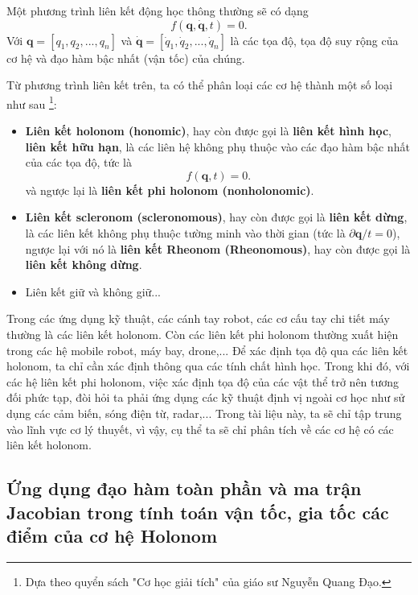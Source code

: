 Một phương trình liên kết động học thông thường sẽ có dạng
\begin{equation}
    f(\mathbf{q}, \mathbf{\dot{q}}, t) = 0.
\end{equation}
Với $\mathbf{q} = [q_1,q_2,...,q_n]$ và $\mathbf{\dot{q}} = [\dot{q}_1,\dot{q}_2,...,\dot{q}_n]$ là các tọa độ, tọa độ suy rộng của cơ hệ và đạo hàm bậc nhất (vận tốc) của chúng.

Từ phương trình liên kết trên, ta có thể phân loại các cơ hệ thành một số loại như sau \footnote{Dựa theo quyển sách "Cơ học giải tích" của giáo sư Nguyễn Quang Đạo.}:
\begin{itemize}
    \item \textbf{Liên kết holonom (honomic)}, hay còn được gọi là \textbf{liên kết hình học}, \textbf{liên kết hữu hạn}, là các liên hệ không phụ thuộc vào các đạo hàm bậc nhất của các tọa độ, tức là
    \begin{equation*}
        f(\mathbf{q}, t) = 0.
    \end{equation*}
    và ngược lại là \textbf{ liên kết phi holonom (nonholonomic)}.
    \item \textbf{Liên kết scleronom (scleronomous)}, hay còn được gọi là \textbf{liên kết dừng}, là các liên kết không phụ thuộc tường minh vào thời gian (tức là $\partial \mathbf{q} / t = 0$), ngược lại với nó là \textbf{liên kết Rheonom (Rheonomous)}, hay còn được gọi là \textbf{liên kết không dừng}.
    \item Liên kết giữ và không giữ... %
\end{itemize}
Trong các ứng dụng kỹ thuật, các cánh tay robot, các cơ cấu tay chi tiết máy thường là các liên kết holonom. 
Còn các liên kết phi holonom thường xuất hiện trong các hệ mobile robot, máy bay, drone,... 
Để xác định tọa độ qua các liên kết holonom, ta chỉ cần xác định thông qua các tính chất hình học. 
Trong khi đó, với các hệ liên kết phi holonom, việc xác định tọa độ của các vật thể trở nên tương đối phức tạp, đòi hỏi ta phải ứng dụng các kỹ thuật định vị ngoài cơ học như sử dụng các cảm biến, sóng điện từ, radar,... 
Trong tài liệu này, ta sẽ chỉ tập trung vào lĩnh vực cơ lý thuyết, vì vậy, cụ thể ta sẽ chỉ phân tích về các cơ hệ có các liên kết holonom.

\subsection{Ứng dụng đạo hàm toàn phần và ma trận Jacobian trong tính toán vận tốc, gia tốc các điểm của cơ hệ Holonom}

